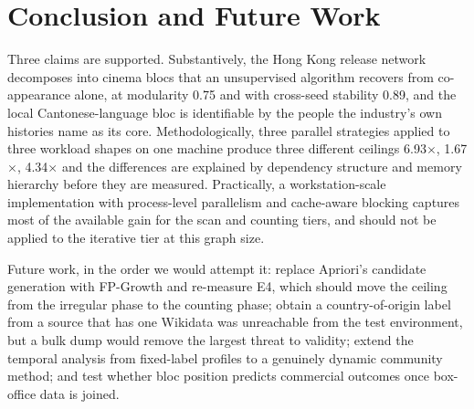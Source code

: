 
\section{Conclusion and Future Work}

Three claims are supported. Substantively, the Hong Kong release network decomposes into cinema blocs that an unsupervised algorithm recovers from co-appearance alone, at modularity 0.75 and with cross-seed stability 0.89, and the local Cantonese-language bloc is identifiable by the people the industry's own histories name as its core. Methodologically, three parallel strategies applied to three workload shapes on one machine produce three different ceilings \textemdash{} 6.93$\times$, 1.67$\times$, 4.34$\times$ \textemdash{} and the differences are explained by dependency structure and memory hierarchy before they are measured. Practically, a workstation-scale implementation with process-level parallelism and cache-aware blocking captures most of the available gain for the scan and counting tiers, and should not be applied to the iterative tier at this graph size.

Future work, in the order we would attempt it: replace Apriori's candidate generation with FP-Growth and re-measure E4, which should move the ceiling from the irregular phase to the counting phase; obtain a country-of-origin label from a source that has one \textemdash{} Wikidata was unreachable from the test environment, but a bulk dump would remove the largest threat to validity; extend the temporal analysis from fixed-label profiles to a genuinely dynamic community method; and test whether bloc position predicts commercial outcomes once box-office data is joined.
